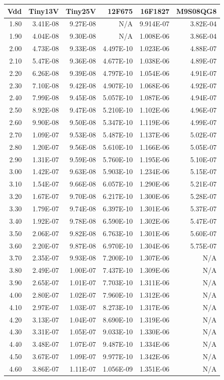\begin{table}[htp]
\begin{centering}
\begin{tabular}{|r|r|r|r|r|r|}
\hline
Vdd  & Tiny13V  & Tiny25V  & 12F675  & 16F1827  & M9S08QG8\tabularnewline
\hline
1.80  & 3.41E-08  & 9.27E-08  & N/A  & 9.914E-07  & 3.82E-04 \tabularnewline
1.90  & 4.04E-08  & 9.30E-08  & N/A  & 1.008E-06  & 3.86E-04 \tabularnewline
2.00  & 4.73E-08  & 9.33E-08  & 4.497E-10  & 1.023E-06  & 4.88E-07 \tabularnewline
2.10  & 5.47E-08  & 9.36E-08  & 4.677E-10  & 1.038E-06  & 4.89E-07 \tabularnewline
2.20  & 6.26E-08  & 9.39E-08  & 4.797E-10  & 1.054E-06  & 4.91E-07 \tabularnewline
2.30  & 7.10E-08  & 9.42E-08  & 4.907E-10  & 1.068E-06  & 4.92E-07 \tabularnewline
2.40  & 7.99E-08  & 9.45E-08  & 5.057E-10  & 1.087E-06  & 4.94E-07 \tabularnewline
2.50  & 8.92E-08  & 9.47E-08  & 5.210E-10  & 1.102E-06  & 4.96E-07 \tabularnewline
2.60  & 9.90E-08  & 9.50E-08  & 5.347E-10  & 1.119E-06  & 4.99E-07 \tabularnewline
2.70  & 1.09E-07  & 9.53E-08  & 5.487E-10  & 1.137E-06  & 5.02E-07 \tabularnewline
2.80  & 1.20E-07  & 9.56E-08  & 5.610E-10  & 1.166E-06  & 5.05E-07 \tabularnewline
2.90  & 1.31E-07  & 9.59E-08  & 5.760E-10  & 1.195E-06  & 5.10E-07 \tabularnewline
3.00  & 1.42E-07  & 9.63E-08  & 5.903E-10  & 1.234E-06  & 5.15E-07 \tabularnewline
3.10  & 1.54E-07  & 9.66E-08  & 6.057E-10  & 1.290E-06  & 5.21E-07 \tabularnewline
3.20  & 1.67E-07  & 9.70E-08  & 6.217E-10  & 1.300E-06  & 5.28E-07 \tabularnewline
3.30  & 1.79E-07  & 9.74E-08  & 6.397E-10  & 1.301E-06  & 5.37E-07 \tabularnewline
3.40  & 1.92E-07  & 9.78E-08  & 6.590E-10  & 1.302E-06  & 5.47E-07 \tabularnewline
3.50  & 2.06E-07  & 9.82E-08  & 6.763E-10  & 1.301E-06  & 5.60E-07 \tabularnewline
3.60  & 2.20E-07  & 9.87E-08  & 6.970E-10  & 1.304E-06  & 5.75E-07 \tabularnewline
3.70  & 2.35E-07  & 9.93E-08  & 7.200E-10  & 1.307E-06  & N/A \tabularnewline
3.80  & 2.49E-07  & 1.00E-07  & 7.437E-10  & 1.309E-06  & N/A \tabularnewline
3.90  & 2.65E-07  & 1.01E-07  & 7.703E-10  & 1.311E-06  & N/A \tabularnewline
4.00  & 2.80E-07  & 1.02E-07  & 7.960E-10  & 1.312E-06  & N/A \tabularnewline
4.10  & 2.97E-07  & 1.03E-07  & 8.273E-10  & 1.317E-06  & N/A \tabularnewline
4.20  & 3.13E-07  & 1.04E-07  & 8.690E-10  & 1.319E-06  & N/A \tabularnewline
4.30  & 3.31E-07  & 1.05E-07  & 9.033E-10  & 1.330E-06  & N/A \tabularnewline
4.40  & 3.48E-07  & 1.07E-07  & 9.487E-10  & 1.334E-06  & N/A \tabularnewline
4.50  & 3.67E-07  & 1.09E-07  & 9.977E-10  & 1.342E-06  & N/A \tabularnewline
4.60  & 3.86E-07  & 1.11E-07  & 1.056E-09  & 1.351E-06  & N/A \tabularnewline

\end{tabular}
\end{centering}
\end{table}
